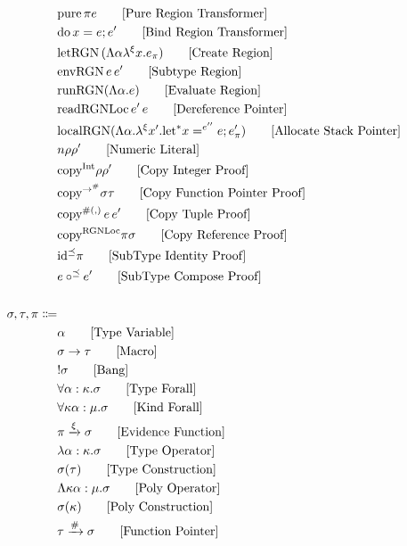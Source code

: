 \documentclass {article}
\begin{document}
\begin{align*}
& \text{pure} \, \pi e \tag*{[Pure Region Transformer]}\\
& \text{do} \, x = e; e' \tag*{[Bind Region Transformer]} \\
& \text{letRGN} \, (\Lambda \alpha \lambda^\xi x. e_\pi) \tag*{[Create Region]} \\
& \text{envRGN} \, e \, e' \tag*{[Subtype Region]} \\
& \text{runRGN} (\Lambda \alpha. e) \tag*{[Evaluate Region]} \\
& \text{readRGNLoc} \, e' \, e \tag*{[Dereference Pointer]} \\
& \text{localRGN} (\Lambda \alpha.\lambda^\xi x'. \text{let}^* x =^{e''} e; e'_\pi ) \tag*{[Allocate Stack Pointer]} \\
& n \rho \rho' \tag*{[Numeric Literal]} \\
& \text{copy}^\text{Int} \rho \rho' \tag*{[Copy Integer Proof]} \\
& \text{copy}^{\to^\#} \sigma \tau \tag*{[Copy Function Pointer Proof]} \\
& \text{copy}^{\#(,)} \, e \, e' \tag*{[Copy Tuple Proof]} \\
& \text{copy}^{\text{RGNLoc}} \pi \sigma \tag*{[Copy Reference Proof]}\\
& \text{id}^\preceq \pi \tag*{[SubType Identity Proof]}\\
& e \circ^\preceq e' \tag*{[SubType Compose Proof]}\\
\\
\sigma, \tau, \pi \Coloneqq & \\
& \alpha \tag* {[Type Variable]} \\
& \sigma \to \tau \tag*{[Macro]} \\
& !\sigma \tag*{[Bang]} \\
& \forall \alpha : \kappa. \sigma \tag*{[Type Forall]}\\ 
& \forall \kappa \alpha : \mu. \sigma \tag*{[Kind Forall]}\\
& \pi \xrightarrow{\xi} \sigma \tag*{[Evidence Function]} \\
& \lambda \alpha : \kappa. \sigma \tag*{[Type Operator]} \\
& \sigma (\tau) \tag*{[Type Construction]} \\
& \Lambda \kappa \alpha : \mu. \sigma \tag*{[Poly Operator]} \\
& \sigma (\kappa) \tag*{[Poly Construction]} \\
& \tau \xrightarrow{\#} \sigma \tag*{[Function Pointer]}\\

\end{align*}
\end{document}

